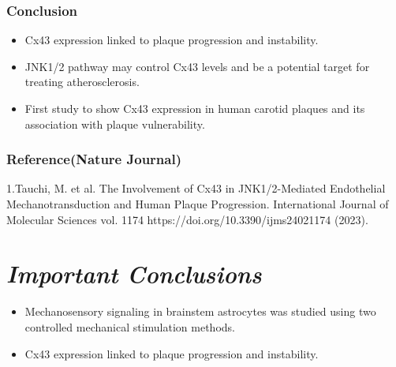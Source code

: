 \documentclass{article}
\begin{document}
\subsubsection{Conclusion}
\begin{itemize}
\item Cx43 expression linked to plaque progression and instability.
\item JNK1/2 pathway may control Cx43 levels and be a potential target for treating atherosclerosis.
\item First study to show Cx43 expression in human carotid plaques and its association with plaque vulnerability.
\end{itemize}
\subsubsection{Reference(Nature Journal)}
1.Tauchi, M. et al. The Involvement of Cx43 in JNK1/2-Mediated Endothelial Mechanotransduction and Human Plaque Progression. International Journal of Molecular Sciences vol. 1174 https://doi.org/10.3390/ijms24021174 (2023).
\newpage
\section{\textit{Important Conclusions}}
\begin{itemize}
\item Mechanosensory signaling in brainstem astrocytes was studied using two controlled mechanical stimulation methods.
\item Cx43 expression linked to plaque progression and instability.
\end{itemize}
\end{document}

